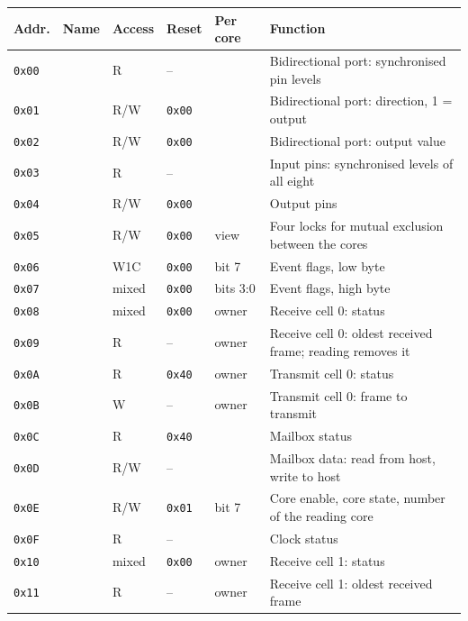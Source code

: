 \begin{table}[H]
\centering\small
\begin{tabularx}{\linewidth}{@{}lllllL@{}}
\toprule
Addr. & Name & Access & Reset & Per core & Function \\
\midrule
\texttt{0x00} &  & R & -- & & Bidirectional port: synchronised pin levels \\
\texttt{0x01} &  & R/W & \texttt{0x00} & & Bidirectional port: direction, 1 = output \\
\texttt{0x02} &  & R/W & \texttt{0x00} & & Bidirectional port: output value \\
\texttt{0x03} &  & R & -- & & Input pins: synchronised levels of all eight \\
\texttt{0x04} &  & R/W & \texttt{0x00} & & Output pins \\
\texttt{0x05} &  & R/W & \texttt{0x00} & view & Four locks for mutual exclusion between the cores \\
\texttt{0x06} &  & W1C & \texttt{0x00} & bit 7 & Event flags, low byte \\
\texttt{0x07} &  & mixed & \texttt{0x00} & bits 3:0 & Event flags, high byte \\
\texttt{0x08} &  & mixed & \texttt{0x00} & owner & Receive cell 0: status \\
\texttt{0x09} &  & R & -- & owner & Receive cell 0: oldest received frame; reading removes it \\
\texttt{0x0A} &  & R & \texttt{0x40} & owner & Transmit cell 0: status \\
\texttt{0x0B} &  & W & -- & owner & Transmit cell 0: frame to transmit \\
\texttt{0x0C} &  & R & \texttt{0x40} & & Mailbox status \\
\texttt{0x0D} &  & R/W & -- & & Mailbox data: read from host, write to host \\
\texttt{0x0E} &  & R/W & \texttt{0x01} & bit 7 & Core enable, core state, number of the reading core \\
\texttt{0x0F} &  & R & -- & & Clock status \\
\midrule
\texttt{0x10} &  & mixed & \texttt{0x00} & owner & Receive cell 1: status \\
\texttt{0x11} &  & R & -- & owner & Receive cell 1: oldest received frame \\

\end{tabularx}
\end{table}
